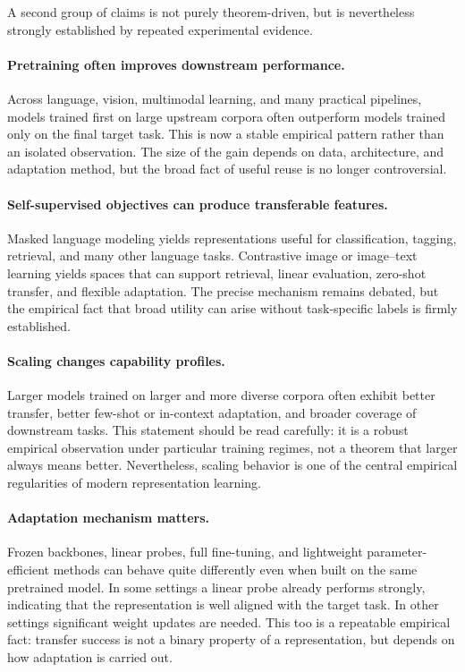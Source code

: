 A second group of claims is not purely theorem-driven, but is nevertheless strongly established by repeated experimental evidence.

\paragraph{Pretraining often improves downstream performance.}
Across language, vision, multimodal learning, and many practical pipelines, models trained first on large upstream corpora often outperform models trained only on the final target task. This is now a stable empirical pattern rather than an isolated observation. The size of the gain depends on data, architecture, and adaptation method, but the broad fact of useful reuse is no longer controversial.

\paragraph{Self-supervised objectives can produce transferable features.}
Masked language modeling yields representations useful for classification, tagging, retrieval, and many other language tasks. Contrastive image or image--text learning yields spaces that can support retrieval, linear evaluation, zero-shot transfer, and flexible adaptation. The precise mechanism remains debated, but the empirical fact that broad utility can arise without task-specific labels is firmly established.

\paragraph{Scaling changes capability profiles.}
Larger models trained on larger and more diverse corpora often exhibit better transfer, better few-shot or in-context adaptation, and broader coverage of downstream tasks. This statement should be read carefully: it is a robust empirical observation under particular training regimes, not a theorem that larger always means better. Nevertheless, scaling behavior is one of the central empirical regularities of modern representation learning.

\paragraph{Adaptation mechanism matters.}
Frozen backbones, linear probes, full fine-tuning, and lightweight parameter-efficient methods can behave quite differently even when built on the same pretrained model. In some settings a linear probe already performs strongly, indicating that the representation is well aligned with the target task. In other settings significant weight updates are needed. This too is a repeatable empirical fact: transfer success is not a binary property of a representation, but depends on how adaptation is carried out.

